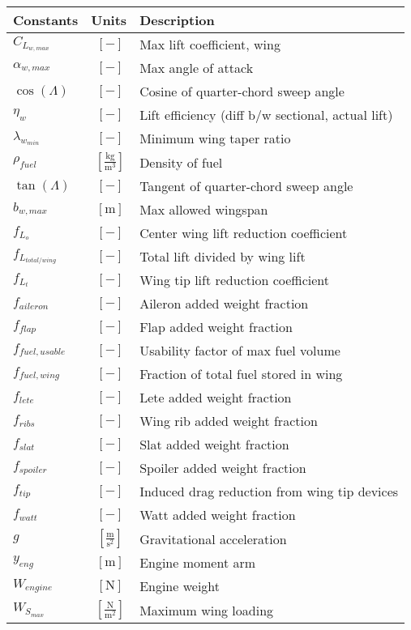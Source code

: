 \documentclass[12pt]{article}
\begin{document}
{\footnotesize
\begin{supertabular}{lcl}
\toprule
Constants & Units & Description \\ \midrule
$C_{L_{w,max}}$ & $~[-]$ & Max lift coefficient, wing \\
$\alpha_{w,max}$ & $~[-]$ & Max angle of attack \\
$\cos(\Lambda)$ & $~[-]$ & Cosine of quarter-chord sweep angle \\
$\eta_w$ & $~[-]$ & Lift efficiency (diff b/w sectional, actual lift) \\
$\lambda_{w_{min}}$ & $~[-]$ & Minimum wing taper ratio \\
$\rho_{fuel}$ & $~\mathrm{[\tfrac{kg}{m^{3}}]}$ & Density of fuel \\
$\tan(\Lambda)$ & $~[-]$ & Tangent of quarter-chord sweep angle \\
$b_{w,max}$ & $~\mathrm{[m]}$ & Max allowed wingspan \\
$f_{L_{o}}$ & $~[-]$ & Center wing lift reduction coefficient \\
$f_{L_{total/wing}}$ & $~[-]$ & Total lift divided by wing lift\\
$f_{L_{t}}$ & $~[-]$ & Wing tip lift reduction coefficient \\
$f_{aileron}$ & $~[-]$ & Aileron added weight fraction \\
$f_{flap}$ & $~[-]$ & Flap added weight fraction \\
$f_{fuel, usable}$ & $~[-]$ & Usability factor of max fuel volume\\
$f_{fuel, wing}$ & $~[-]$ & Fraction of total fuel stored in wing\\
$f_{lete}$ & $~[-]$ & Lete added weight fraction \\
$f_{ribs}$ & $~[-]$ & Wing rib added weight fraction \\
$f_{slat}$ & $~[-]$ & Slat added weight fraction \\
$f_{spoiler}$ & $~[-]$ & Spoiler added weight fraction \\
$f_{tip}$ & $~[-]$ & Induced drag reduction from wing tip devices \\
$f_{watt}$ & $~[-]$ & Watt added weight fraction \\
$g$ & $~\mathrm{[\tfrac{m}{s^{2}}]}$ & Gravitational acceleration \\
$y_{eng}$ & $~\mathrm{[m]}$ & Engine moment arm \\
$W_{engine}$ & $~\mathrm{[N]}$ & Engine weight \\
$W_{S_{max}}$ & $~\mathrm{[\frac{N}{m^2}]}$ & Maximum wing loading \\

\end{supertabular}}
\end{document}
